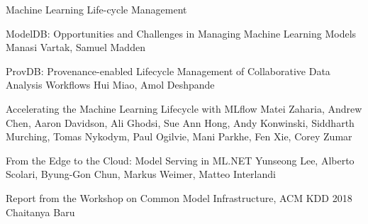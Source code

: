 \documentclass[11pt]{article}
\begin{document}
\begin{bulletin}
\begin{articlesection}{Machine Learning Life-cycle Management}
\begin{article}
{{\sc ModelDB}: Opportunities and Challenges in Managing Machine Learning Models}
{Manasi Vartak, Samuel Madden}
\graphicspath{{submissions/DEB-ModelDB/figs/}}

\end{article}


\begin{article}
{{ProvDB:} Provenance-enabled Lifecycle Management of Collaborative Data Analysis Workflows}
{Hui Miao, Amol Deshpande}
\graphicspath{{submissions/ProvDB/figs/}}

\end{article}


\begin{article}
{Accelerating the Machine Learning Lifecycle with {MLflow}}
{Matei Zaharia, Andrew Chen, Aaron Davidson, Ali Ghodsi, Sue Ann Hong, Andy Konwinski, Siddharth Murching, Tomas Nykodym, Paul Ogilvie, Mani Parkhe, Fen Xie, Corey Zumar}
\graphicspath{{submissions/mlflow/}}

\end{article}



\begin{article}
{From the Edge to the Cloud: Model Serving in ML.NET}
{Yunseong Lee, Alberto Scolari, Byung-Gon Chun, Markus Weimer, Matteo Interlandi}
\graphicspath{{submissions/model_serving_dot_net/figs/}}

\end{article}


\begin{article}
{Report from the Workshop on Common Model Infrastructure, {ACM KDD 2018}}
{Chaitanya Baru}

\end{article}



\end{articlesection}

%
%
%
%
%
%
%



\end{bulletin}
\end{document}
